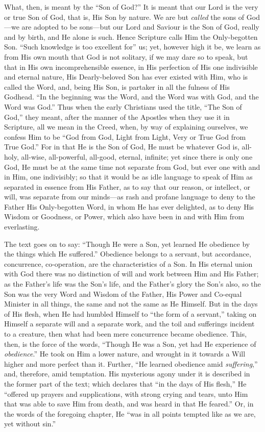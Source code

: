 What, then, is meant by the ``Son of God?'' It is meant
that our Lord is the very or true Son of God, that is, His Son by
nature. We are but \emph{called} the sons of God—we are adopted to
be sons—but our Lord and Saviour is the Son of God, really and by
birth, and He alone is such. Hence Scripture calls Him the
Only-begotten Son. ``Such knowledge is too excellent for'' us;
yet, however high it be, we learn as from His own mouth that God is not
solitary, if we may dare so to speak, but that in His own
incomprehensible essence, in His perfection of His one indivisible and
eternal nature, His Dearly-beloved Son has ever existed with Him, who
is called the Word, and, being His Son, is partaker in all the fulness
of His Godhead. ``In the beginning was the Word, and the Word was
with God, and the Word was God.'' Thus when the early Christians
used the title, ``The Son of God,'' they meant, after the
manner of the Apostles when they use it in Scripture, all we mean in
the Creed, when, by way of explaining ourselves, we confess Him to be
``God from God, Light from Light, Very or True God from True
God.'' For in that He is the Son of God, He must be whatever God
is, all-holy, all-wise, all-powerful, all-good, eternal, infinite; yet
since there is only one God, He must be at the same time not separate
from God, but ever one with and in Him, one indivisibly; so that it
would be as idle language to speak of Him as separated in essence from
His Father, as to say that our reason, or intellect, or will, was
separate from our minds—as rash and profane language to deny to the
Father His Only-begotten Word, in whom He has ever delighted, as to
deny His Wisdom or Goodness, or Power, which also have been in and
with Him from everlasting.

The text goes on to say: ``Though He were a Son, yet learned He
obedience by the things which He suffered.'' Obedience belongs to
a servant, but accordance, concurrence, co-operation, are the
characteristics of a Son. In His eternal union with God there was no
distinction of will and work between Him and His Father; as the
Father's life was the Son's life, and the Father's glory the Son's
also, so the Son was the very Word and Wisdom of the Father, His Power
and Co-equal Minister in all things, the same and not the same as He
Himself. But in the days of His flesh, when He had humbled Himself to
``the form of a servant,'' taking on Himself a separate will
and a separate work, and the toil and sufferings incident to a
creature, then what had been mere concurrence became obedience. This,
then, is the force of the words, ``Though He was a Son, yet had He
experience of \emph{obedience}.'' He took on Him a lower nature,
and wrought in it towards a Will higher and more perfect than it.
Further, ``He learned obedience amid \emph{suffering},'' and,
therefore, amid temptation. His mysterious agony under it is described
in the former part of the text; which declares that ``in the days
of His flesh,'' He ``offered up prayers and supplications,
with strong crying and tears, unto Him that was able to save Him from
death, and was heard in that He feared.'' Or, in the words of the
foregoing chapter, He ``was in all points tempted like as we are,
yet without sin.''

